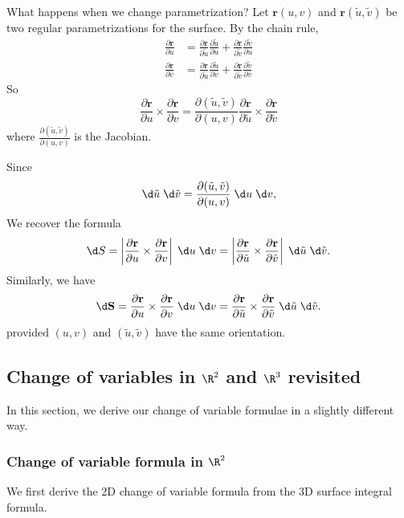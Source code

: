 \documentclass[a4paper]{article}
\begin{document}
What happens when we change parametrization? Let $\mathbf{r}(u, v)$ and $\mathbf{r}(\tilde{u}, \tilde{v})$ be two regular parametrizations for the surface. By the chain rule,
\begin{align*}
  \frac{\partial \mathbf{r}}{\partial u} &= \frac{\partial \mathbf{r}}{\partial \tilde{u}}\frac{\partial\tilde{u}}{\partial u} + \frac{\partial \mathbf{r}}{\partial \tilde{v}}\frac{\partial\tilde{v}}{\partial u}\\
  \frac{\partial \mathbf{r}}{\partial v} &= \frac{\partial \mathbf{r}}{\partial \tilde{u}}\frac{\partial\tilde{u}}{\partial v} + \frac{\partial \mathbf{r}}{\partial \tilde{v}}\frac{\partial\tilde{v}}{\partial v}
\end{align*}
So
\[
  \frac{\partial \mathbf{r}}{\partial u}\times\frac{\partial\mathbf{r}}{\partial v} = \frac{\partial (\tilde{u}, \tilde{v})}{\partial (u, v)} \frac{\partial \mathbf{r}}{\partial \tilde {u}}\times\frac{\partial\mathbf{r}}{\partial \tilde{v}}
\]
where $\frac{\partial (\tilde{u}, \tilde{v})}{\partial(u, v)}$ is the Jacobian.

Since
\[
  \d \tilde{u}\;\d \tilde{v} = \frac{\partial (\tilde{u}, \tilde{v})}{\partial (u, v)}\;\d u\;\d v,
\]
We recover the formula
\[
  \d S = \left|\frac{\partial \mathbf{r}}{\partial u}\times\frac{\partial\mathbf{r}}{\partial v}\right|\;\d u\;\d v = \left|\frac{\partial \mathbf{r}}{\partial \tilde {u}}\times\frac{\partial\mathbf{r}}{\partial \tilde{v}}\right| \;\d \tilde{u}\;\d \tilde{v}.
\]
Similarly, we have
\[
  \d \mathbf{S} = \frac{\partial \mathbf{r}}{\partial u}\times\frac{\partial\mathbf{r}}{\partial v}\;\d u\;\d v = \frac{\partial \mathbf{r}}{\partial \tilde {u}}\times\frac{\partial\mathbf{r}}{\partial \tilde{v}} \;\d \tilde{u}\;\d \tilde{v}.
\]
provided $(u, v)$ and $(\tilde{u}, \tilde{v})$ have the same orientation.
\subsection{Change of variables in \texorpdfstring{$\R^2$ and $\R^3$}{R2 and R3} revisited}
In this section, we derive our change of variable formulae in a slightly different way.

\subsubsection*{Change of variable formula in \texorpdfstring{$\R^2$}{R2}}
We first derive the 2D change of variable formula from the 3D surface integral formula.
\end{document}
